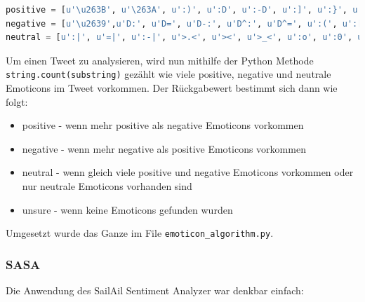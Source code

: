\begin{lstlisting}[language=Python, caption={Emoticon Arrays}, label={lst:emoticonlisting}]
positive = [u'\u263B', u'\263A', u':)', u':D', u':-D', u':]', u':}', u':o)', u':o]', u':o}', u':-]', u':-)', u':-}', u'=)', u'=]', u'=}', u'=^]', u'=^)', u'=^}', u':B', u':-D', u':-B', u':^D', u':^B', u'=B', u'=^B', u'=^D', u':\'), u':\']', u':\'}', u'<3', u'^.^', u'^-^', u'^_^', u'^^', u':*', u'=*', u':-*', u';)', u';]', u';}', u':-p', u':-P', u':-b', u':^p', u':^P', u':^b', u'=P', u'=p', u'/o/', u':P', u':p', u':b', u'=b', u'=^p', u'=^P', u'=^b', u'\o/']
negative = [u'\u2639',u'D:', u'D=', u'D-:', u'D^:', u'D^=', u':(', u':[', u':{', u':o(', u':o[', u':^(', u':^[', u':^{', u'=^(', u'=^{', u'>=(', u'>=[', u'>={', u'>=(', u'>:-{', u'>:-[', u'>:-(', u'>=^[', u'>:-(', u':-[', u':-(', u'=(', u'=[', u'={', u'=^[', u'>:-=(', u'>=[', u'>=^(', u'=\\', u':\\', u'=/', u'=$', u'o.O', u'O_o', u'Oo', u':$:-{', u'>:-{', u'>=^{', u':o{']
neutral = [u':|', u'=|', u':-|', u'>.<', u'><', u'>_<', u':o', u':0', u'=O', u':@', u'=@', u':^o', u':^@', u'-.-', u'-_-', u':x', u'=X', u':-x', u':-@', u':-#', u':^x']
\end{lstlisting}

Um einen Tweet zu analysieren, wird nun mithilfe der Python Methode \lstinline$string.count(substring)$ gezählt wie viele positive, negative und neutrale Emoticons im Tweet vorkommen. Der Rückgabewert bestimmt sich dann wie folgt:

\begin{itemize}
	\item positive - wenn mehr positive als negative Emoticons vorkommen
	\item negative - wenn mehr negative als positive Emoticons vorkommen
	\item neutral - wenn gleich viele positive und negative Emoticons vorkommen oder nur neutrale Emoticons vorhanden sind
	\item unsure - wenn keine Emoticons gefunden wurden
\end{itemize} 

Umgesetzt wurde das Ganze im File \lstinline$emoticon_algorithm.py$.

\subsubsection{SASA}
Die Anwendung des SailAil Sentiment Analyzer war denkbar einfach:


